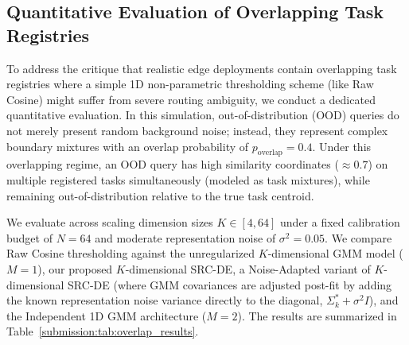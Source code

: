 \subsection{Quantitative Evaluation of Overlapping Task Registries}
\label{submission:sec:overlap_eval}
To address the critique that realistic edge deployments contain overlapping task registries where a simple 1D non-parametric thresholding scheme (like Raw Cosine) might suffer from severe routing ambiguity, we conduct a dedicated quantitative evaluation. In this simulation, out-of-distribution (OOD) queries do not merely present random background noise; instead, they represent complex boundary mixtures with an overlap probability of $p_{\text{overlap}} = 0.4$. Under this overlapping regime, an OOD query has high similarity coordinates ($\approx 0.7$) on multiple registered tasks simultaneously (modeled as task mixtures), while remaining out-of-distribution relative to the true task centroid.

We evaluate across scaling dimension sizes $K \in [4, 64]$ under a fixed calibration budget of $N=64$ and moderate representation noise of $\sigma^2 = 0.05$. We compare Raw Cosine thresholding against the unregularized $K$-dimensional GMM model ($M=1$), our proposed $K$-dimensional SRC-DE, a Noise-Adapted variant of $K$-dimensional SRC-DE (where GMM covariances are adjusted post-fit by adding the known representation noise variance directly to the diagonal, $\Sigma^{*}_{k} + \sigma^2 I$), and the Independent 1D GMM architecture ($M=2$). The results are summarized in Table~\ref{submission:tab:overlap_results}.

